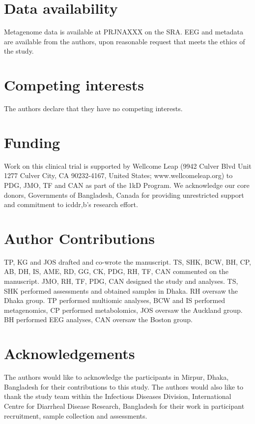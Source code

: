 \documentclass{article}
\begin{document}
\section*{Data availability}
Metagenome data is available at PRJNAXXX on the SRA. 
EEG and metadata are available from the authors, upon reasonable request that meets the ethics of the study.

\section*{Competing interests}
The authors declare that they have no competing interests.

\section*{Funding}
Work on this clinical trial is supported by Wellcome Leap (9942 Culver Blvd Unit 1277 Culver City, CA 90232-4167, United States; www.wellcomeleap.org) to PDG, JMO, TF and CAN as part of the 1kD Program.
We acknowledge our core donors, Governments of Bangladesh, Canada for providing unrestricted support and commitment to icddr,b's research effort.

\section*{Author Contributions}
TP, KG and JOS drafted and co-wrote the manuscript.
TS, SHK, BCW, BH, CP, AB, DH, IS, AME, RD, GG, CK, PDG, RH, TF, CAN commented on the manuscript.
JMO, RH, TF, PDG, CAN designed the study and analyses.
TS, SHK performed assessments and obtained samples in Dhaka.
RH oversaw the Dhaka group.
TP performed multiomic analyses, BCW and IS performed metagenomics, CP performed metabolomics, JOS oversaw the Auckland group.
BH performed EEG analyses, CAN oversaw the Boston group.

\section*{Acknowledgements}
The authors would like to acknowledge the participants in Mirpur, Dhaka, Bangladesh for their contributions to this study.
The authors would also like to thank the study team within the Infectious Diseases Division, International Centre for Diarrheal Disease Research, Bangladesh for their work in participant recruitment, sample collection and assessments.


\end{document}
